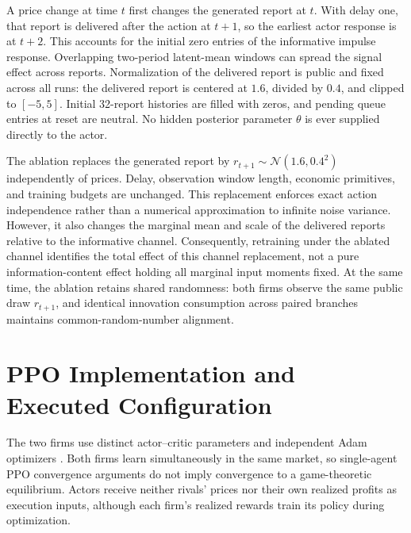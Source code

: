 \documentclass{article}
\begin{document}
A price change at time $t$ first changes the generated report at $t$. With delay one, that report is delivered after the action at $t+1$, so the earliest actor response is at $t+2$. This accounts for the initial zero entries of the informative impulse response. Overlapping two-period latent-mean windows can spread the signal effect across reports. Normalization of the delivered report is public and fixed across all runs: the delivered report is centered at $1.6$, divided by $0.4$, and clipped to $[-5,5]$. Initial 32-report histories are filled with zeros, and pending queue entries at reset are neutral. No hidden posterior parameter $\theta$ is ever supplied directly to the actor.

The ablation replaces the generated report by $r_{t+1} \sim \mathcal{N}(1.6, 0.4^2)$ independently of prices. Delay, observation window length, economic primitives, and training budgets are unchanged. This replacement enforces exact action independence rather than a numerical approximation to infinite noise variance. However, it also changes the marginal mean and scale of the delivered reports relative to the informative channel. Consequently, retraining under the ablated channel identifies the total effect of this channel replacement, not a pure information-content effect holding all marginal input moments fixed. At the same time, the ablation retains shared randomness: both firms observe the same public draw $r_{t+1}$, and identical innovation consumption across paired branches maintains common-random-number alignment.

\section{PPO Implementation and Executed Configuration}

The two firms use distinct actor--critic parameters and independent Adam optimizers \citep{schulman2017proximal}. Both firms learn simultaneously in the same market, so single-agent PPO convergence arguments do not imply convergence to a game-theoretic equilibrium. Actors receive neither rivals' prices nor their own realized profits as execution inputs, although each firm's realized rewards train its policy during optimization.
\end{document}
